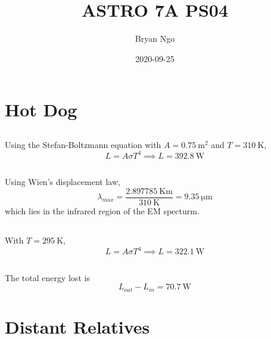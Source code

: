 \documentclass{article}
\title{ASTRO 7A PS04}
\author{Bryan Ngo}
\date{2020-09-25}
\begin{document}
\maketitle

\section{Hot Dog}

\subsection{}

Using the Stefan-Boltzmann equation with \(A = \SI{0.75}{\meter\squared}\) and \(T = \SI{310}{\kelvin}\),
\begin{equation}
    L = A \sigma T^4 \implies L = \SI{392.8}{\watt}
\end{equation}

\subsection{}

Using Wien's displacement law,
\begin{equation}
    \lambda_{max} = \frac{\SI{2.897785}{\kelvin\meter}}{\SI{310}{\kelvin}} = \SI{9.35}{\micro\meter}
\end{equation}
which lies in the infrared region of the EM specturm.

\subsection{}

With \(T = \SI{295}{\kelvin}\),
\begin{equation}
    L = A \sigma T^4 \implies L = \SI{322.1}{\watt}
\end{equation}

\subsection{}

The total energy lost is
\begin{equation}
    L_{out} - L_{in} = \SI{70.7}{\watt}
\end{equation}

\section{Distant Relatives}
\end{document}
